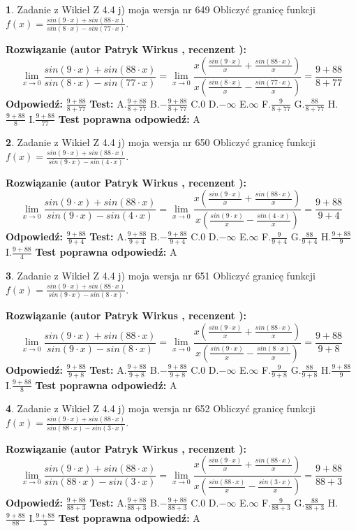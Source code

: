 \documentclass[12pt, a4paper]{article}
\theoremstyle{definition} %
\newtheorem{zad}{}
\newcommand{\zadStart}[1]{\begin{zad}#1\newline}
\newcommand{\zadStop}{\end{zad}}
\newcommand{\rozwStart}[2]{\noindent \textbf{Rozwiązanie (autor #1 , recenzent #2): }\newline}
\newcommand{\rozwStop}{\newline}
\newcommand{\odpStart}{\noindent \textbf{Odpowiedź:}\newline}
\newcommand{\odpStop}{\newline}
\newcommand{\testStart}{\noindent \textbf{Test:}\newline}
\newcommand{\testStop}{\newline}
\newcommand{\kluczStart}{\noindent \textbf{Test poprawna odpowiedź:}\newline}
\newcommand{\kluczStop}{\newline}
\begin{document}
\zadStart{Zadanie z Wikieł Z 4.4 j) moja wersja nr 649}
Obliczyć granicę funkcji $f(x)=\frac{sin(9\cdot x) +sin(88\cdot x)}{sin(8\cdot x) -sin(77\cdot x)}$.
\zadStop
\rozwStart{Patryk Wirkus}{}
$$\lim\limits_{x\to 0}\frac{sin(9\cdot x) +sin(88\cdot x)}{sin(8\cdot x) -sin(77\cdot x)}=\lim\limits_{x\to 0}\frac{x(\frac{sin(9\cdot x)}{x}+\frac{sin(88\cdot x)}{x})}{x(\frac{sin(8\cdot x)}{x}-\frac{sin(77\cdot x)}{x})}=\frac{9+88}{8+77}$$
\rozwStop
\odpStart
$\frac{9+88}{8+77}$
\odpStop
\testStart
A.$\frac{9+88}{8+77}$
B.$-\frac{9+88}{8+77}$
C.$0$
D.$-\infty$
E.$\infty$
F.$\frac{9}{8+77}$
G.$\frac{88}{8+77}$
H.$\frac{9+88}{8}$
I.$\frac{9+88}{77}$
\testStop
\kluczStart
A
\kluczStop



\zadStart{Zadanie z Wikieł Z 4.4 j) moja wersja nr 650}
Obliczyć granicę funkcji $f(x)=\frac{sin(9\cdot x) +sin(88\cdot x)}{sin(9\cdot x) -sin(4\cdot x)}$.
\zadStop
\rozwStart{Patryk Wirkus}{}
$$\lim\limits_{x\to 0}\frac{sin(9\cdot x) +sin(88\cdot x)}{sin(9\cdot x) -sin(4\cdot x)}=\lim\limits_{x\to 0}\frac{x(\frac{sin(9\cdot x)}{x}+\frac{sin(88\cdot x)}{x})}{x(\frac{sin(9\cdot x)}{x}-\frac{sin(4\cdot x)}{x})}=\frac{9+88}{9+4}$$
\rozwStop
\odpStart
$\frac{9+88}{9+4}$
\odpStop
\testStart
A.$\frac{9+88}{9+4}$
B.$-\frac{9+88}{9+4}$
C.$0$
D.$-\infty$
E.$\infty$
F.$\frac{9}{9+4}$
G.$\frac{88}{9+4}$
H.$\frac{9+88}{9}$
I.$\frac{9+88}{4}$
\testStop
\kluczStart
A
\kluczStop



\zadStart{Zadanie z Wikieł Z 4.4 j) moja wersja nr 651}
Obliczyć granicę funkcji $f(x)=\frac{sin(9\cdot x) +sin(88\cdot x)}{sin(9\cdot x) -sin(8\cdot x)}$.
\zadStop
\rozwStart{Patryk Wirkus}{}
$$\lim\limits_{x\to 0}\frac{sin(9\cdot x) +sin(88\cdot x)}{sin(9\cdot x) -sin(8\cdot x)}=\lim\limits_{x\to 0}\frac{x(\frac{sin(9\cdot x)}{x}+\frac{sin(88\cdot x)}{x})}{x(\frac{sin(9\cdot x)}{x}-\frac{sin(8\cdot x)}{x})}=\frac{9+88}{9+8}$$
\rozwStop
\odpStart
$\frac{9+88}{9+8}$
\odpStop
\testStart
A.$\frac{9+88}{9+8}$
B.$-\frac{9+88}{9+8}$
C.$0$
D.$-\infty$
E.$\infty$
F.$\frac{9}{9+8}$
G.$\frac{88}{9+8}$
H.$\frac{9+88}{9}$
I.$\frac{9+88}{8}$
\testStop
\kluczStart
A
\kluczStop



\zadStart{Zadanie z Wikieł Z 4.4 j) moja wersja nr 652}
Obliczyć granicę funkcji $f(x)=\frac{sin(9\cdot x) +sin(88\cdot x)}{sin(88\cdot x) -sin(3\cdot x)}$.
\zadStop
\rozwStart{Patryk Wirkus}{}
$$\lim\limits_{x\to 0}\frac{sin(9\cdot x) +sin(88\cdot x)}{sin(88\cdot x) -sin(3\cdot x)}=\lim\limits_{x\to 0}\frac{x(\frac{sin(9\cdot x)}{x}+\frac{sin(88\cdot x)}{x})}{x(\frac{sin(88\cdot x)}{x}-\frac{sin(3\cdot x)}{x})}=\frac{9+88}{88+3}$$
\rozwStop
\odpStart
$\frac{9+88}{88+3}$
\odpStop
\testStart
A.$\frac{9+88}{88+3}$
B.$-\frac{9+88}{88+3}$
C.$0$
D.$-\infty$
E.$\infty$
F.$\frac{9}{88+3}$
G.$\frac{88}{88+3}$
H.$\frac{9+88}{88}$
I.$\frac{9+88}{3}$
\testStop
\kluczStart
A
\kluczStop
\end{document}
